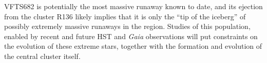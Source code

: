 \documentclass[a4paper,fleqn,usenatbib]{mnras}
\begin{document}
VFTS682 is potentially the most massive runaway known to date, and its ejection
from the cluster R136 likely implies that it is only the ``tip of the
iceberg'' of possibly extremely massive runaways in the
region. Studies of this population, enabled by recent and future HST and \emph{Gaia} observations will put constraints on the evolution
of these extreme stars, together with the formation and evolution of
the central cluster itself.
\vspace*{-20pt}




\label{lastpage}



\end{document}
